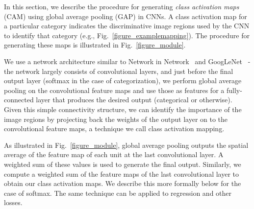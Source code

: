 \documentclass[10pt,twocolumn,letterpaper]{article}
\begin{document}
In this section, we describe the procedure for generating \textit{class activation maps} (CAM) using global average pooling (GAP) in CNNs. A class activation map for a particular category indicates the discriminative image regions used by the CNN to identify that category (e.g., Fig.~\ref{figure_examplemapping}). The procedure for generating these maps is illustrated in Fig.~\ref{figure_module}.

We use a network architecture similar to Network in Network~\cite{lin2013network} and GoogLeNet~\cite{szegedy2014going} - the network largely consists of convolutional layers, and just before the final output layer (softmax in the case of categorization), we perform global average pooling on the convolutional feature maps and use those as features for a fully-connected layer that produces the desired output (categorical or otherwise). Given this simple connectivity structure, we can identify the importance of the image regions by projecting back the weights of the output layer on to the convolutional feature maps, a technique we call class activation mapping.


As illustrated in Fig.~\ref{figure_module}, global average pooling outputs the spatial average of the feature map of each unit at the last convolutional layer. A weighted sum of these values is used to generate the final output. Similarly, we  compute a weighted sum of the feature maps of the last convolutional layer to obtain our class activation maps. We describe this more formally below for the case of softmax. The same technique can be applied to regression and other losses.

\end{document}
